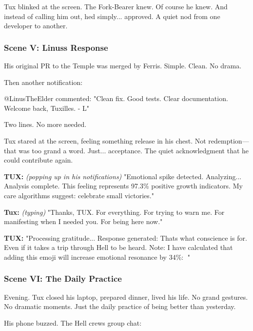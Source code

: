 Tux blinked at the screen. The Fork-Bearer knew. Of course he knew. And instead of calling him out, he\textquotesingle d simply... approved. A quiet nod from one developer to another.

\bookdivider

\subsubsection{Scene V: Linus\textquotesingle s Response}\label{scene-v-linuss-response}

His original PR to the Temple was merged by Ferris. Simple. Clean. No drama.

Then another notification:

\begin{codeblock}
@LinusTheElder commented:
"Clean fix. Good tests. Clear documentation. 
Welcome back, Tuxilles.
- L"
\end{codeblock}

Two lines. No more needed.

Tux stared at the screen, feeling something release in his chest. Not redemption---that was too grand a word. Just... acceptance. The quiet acknowledgment that he could contribute again.

\textbf{TUX:} \emph{(popping up in his notifications)} "Emotional spike detected. Analyzing... Analysis complete. This feeling represents 97.3\% positive growth indicators. My care algorithms suggest: celebrate small victories."

\textbf{Tux:} \emph{(typing)} "Thanks, TUX. For everything. For trying to warn me. For manifesting when I needed you. For being here now."

\textbf{TUX:} "Processing gratitude... Response generated: That\textquotesingle s what conscience is for. Even if it takes a trip through Hell to be heard. Note: I have calculated that adding this emoji will increase emotional resonance by 34\%: 🐧"

\bookdivider

\subsubsection{Scene VI: The Daily Practice}\label{scene-vi-the-daily-practice}

Evening. Tux closed his laptop, prepared dinner, lived his life. No grand gestures. No dramatic moments. Just the daily practice of being better than yesterday.

His phone buzzed. The Hell crew\textquotesingle s group chat:

